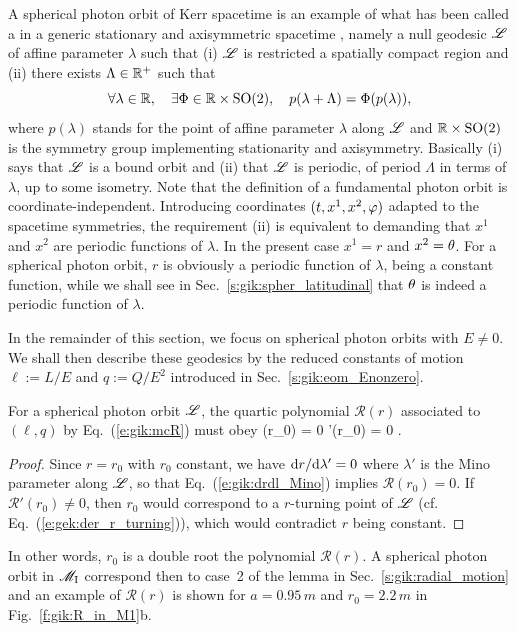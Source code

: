 \begin{remark}
A spherical photon orbit of Kerr spacetime is an example of what has been called
a  in a generic stationary and axisymmetric
spacetime \cite{CunhaH18,CunhaHR17}, namely a null geodesic $\mathscr{L}$ of affine
parameter $\lambda$ such
that (i) $\mathscr{L}$ is restricted a spatially compact region and (ii) there exists
$\Lambda\in\mathbb{R}^+$ such that
\[
    \forall \lambda\in\mathbb{R}, \quad \exists \Phi\in \mathbb{R}\times\mathrm{SO(2)},
    \quad p(\lambda + \Lambda) = \Phi(p(\lambda)) ,
\]
where $p(\lambda)$ stands for the point of affine parameter $\lambda$ along $\mathscr{L}$
and $\mathbb{R}\times\mathrm{SO(2)}$ is the symmetry group implementing
stationarity and axisymmetry. Basically (i) says that $\mathscr{L}$ is a bound orbit
and (ii) that $\mathscr{L}$ is periodic, of period $\Lambda$ in terms of $\lambda$,
up to some isometry. Note that the definition of a fundamental photon orbit
is coordinate-independent. Introducing coordinates $(t,x^1,x^2,\varphi)$ adapted
to the spacetime symmetries, the requirement (ii) is equivalent to
demanding that $x^1$ and $x^2$ are periodic functions of $\lambda$. In the
present case $x^1 = r$ and $x^2 = \theta$. For a spherical photon orbit, $r$
is obviously a periodic function of $\lambda$, being a constant function, while
we shall see in Sec.~\ref{s:gik:spher_latitudinal} that $\theta$ is indeed
a periodic function of $\lambda$.
\end{remark}

In the remainder of this section, we focus on spherical photon orbits with $E\neq 0$.
We shall then describe these geodesics by the reduced constants of motion $\ell := L/E$
and $q := Q/E^2$ introduced in Sec.~\ref{s:gik:eom_Enonzero}.

For a spherical photon orbit $\mathscr{L}$,
the quartic polynomial $\mathcal{R}(r)$ associated to $(\ell,q)$ by Eq.~(\ref{e:gik:mcR})
must obey
\be \label{e:gik:R_Rp_r0_zero}
    (r_0) = 0 \qand {}'(r_0) = 0 .
\ee
\begin{proof}
Since $r=r_0$ with $r_0$ constant, we have $\mathrm{d} r/\mathrm{d}\lambda' = 0$ where $\lambda'$ is the Mino parameter along $\mathscr{L}$, so
that Eq.~(\ref{e:gik:drdl_Mino}) implies $\mathcal{R}(r_0) = 0$. If $\mathcal{R}'(r_0) \neq 0$,
then $r_0$ would correspond to a $r$-turning point of $\mathscr{L}$  (cf. Eq.~(\ref{e:gek:der_r_turning})),
which would contradict $r$ being constant.
\end{proof}
In other words, $r_0$ is a double root the polynomial $\mathcal{R}(r)$. A spherical
photon orbit in $\mathscr{M}_{\rm I}$ correspond then to case~2 of the lemma in
Sec.~\ref{s:gik:radial_motion} and an example of $\mathcal{R}(r)$ is shown
for $a=0.95\, m$ and $r_0=2.2\, m$ in Fig.~\ref{f:gik:R_in_M1}b.

